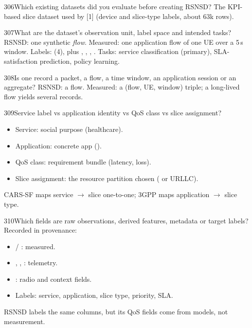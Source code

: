 \begin{qa}{306}{Which existing datasets did you evaluate before creating RSNSD?}
The KPI-based slice dataset used by [1] (device and slice-type labels, about 63k rows).
\end{qa}

\begin{qa}{307}{What are the dataset's observation unit, label space and intended tasks?}
RSNSD: one synthetic \emph{flow}. Measured: one application flow of one UE over a 5\,s window.
Labels:  (4), plus , , ,
. Tasks: service classification (primary), SLA-satisfaction prediction, policy learning.
\end{qa}

\begin{qa}{308}{Is one record a packet, a flow, a time window, an application session or an aggregate?}
RSNSD: a flow. Measured: a (flow, UE, window) triple; a long-lived flow yields several records.
\end{qa}

\begin{qa}{309}{Service label vs application identity vs QoS class vs slice assignment?}
\begin{itemize}
\item Service: social purpose (healthcare).
\item Application: concrete app ().
\item QoS class: requirement bundle (latency, loss).
\item Slice assignment: the resource partition chosen ( or URLLC).
\end{itemize}
CARS-SF maps service $\to$ slice one-to-one; 3GPP maps application $\to$ slice type.
\end{qa}

\begin{qa}{310}{Which fields are raw observations, derived features, metadata or target labels?}
Recorded in  provenance:
\begin{itemize}
\item {} / : measured.
\item {}, , : telemetry.
\item {}: radio and context fields.
\item Labels: service, application, slice type, priority, SLA.
\end{itemize}
RSNSD labels the same columns, but its QoS fields come from models, not measurement.
\end{qa}

